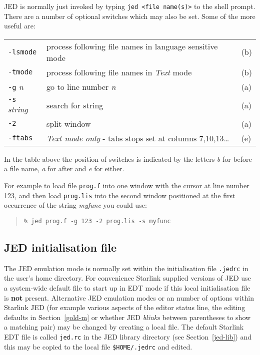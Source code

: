 \documentclass[twoside,11pt]{article}
\newcommand{\xlabel}[1]{}
\begin{document}
JED is normally just invoked by typing \texttt{jed <file name(s)>} to
the shell prompt. There are a number of optional switches which may
also be set. Some of the more useful are:
\begin{center}
\begin{tabular}{lll}
\texttt{-lsmode} & process following file names in language sensitive mode & (b)\\
\texttt{-tmode} & process following file names in \textit{Text} mode & (b)\\
\texttt{-g} \textit{n} & go to line number \textit{n} & (a)\\
\texttt{-s} \textit{string} & search for string & (a)\\
\texttt{-2} & split window & (a)\\
\texttt{-ftabs} & \textit{Text mode only} - tabs stops set at columns 7,10,13\ldots & (e)\\
\end{tabular}
\end{center}

In the table above the position of switches is indicated by the letters
\textit{b} for before a file name, \textit{a} for after and \textit{e} for
either.

For example to load file \texttt{prog.f} into one window with the cursor at
line number 123, and then load \texttt{prog.lis} into the second window
positioned at the first occurrence of the string \textit{myfunc} you could
use:
\begin{quote}
\begin{verbatim}
% jed prog.f -g 123 -2 prog.lis -s myfunc
\end{verbatim}
\end{quote}

\subsection{\xlabel{jed_initialisation_file}JED initialisation file}
\label{jed_initialisation_file}

The JED emulation mode is normally set within the initialisation file
\texttt{.jedrc} in the user's home directory. For convenience Starlink
supplied versions of JED use a system-wide default file to start up in EDT
mode if this local initialisation file is \textbf{not} present.
Alternative JED emulation modes
or an number of options within Starlink JED (for example various
aspects of the editor status line, the editing defaults in
Section~{\ref{gold-m}} or whether JED \textit{blinks} between
parentheses to show a matching pair) may be changed by creating a
local file. The default Starlink EDT file is called
\label{default-jedrc}
\texttt{jed.rc} in the JED library directory (see
Section~{\ref{jed-lib}}) and this may be copied to the local file
\texttt{\$HOME/.jedrc} and edited.
\end{document}
